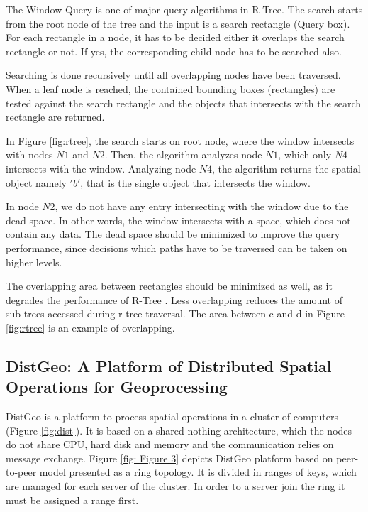 The Window Query is one of major query algorithms in R-Tree.
The search starts from the root node of the tree and the input is a search rectangle (Query box). 
For each rectangle in a node, it has to be decided either it overlaps the search rectangle or not. If yes, the corresponding child node has to be searched also. 

Searching is done recursively until all overlapping nodes have been traversed. 
When a leaf node is reached, the contained bounding boxes (rectangles) are tested against the search rectangle 
and the objects that intersects with the search rectangle are returned.

In Figure \ref{fig:rtree}, the search starts on root node, where the window intersects with nodes $N1$ and $N2$. Then, the algorithm analyzes node $N1$, 
which only $N4$ intersects with the window. Analyzing node $N4$, the algorithm returns the spatial object namely $'b'$, that is the single object that intersects the window.

In node $N2$, we do not have any entry intersecting with the window due to the dead space. 
In other words, the window intersects with a space, which does not contain any data.
The dead space should be minimized to improve the query performance, since decisions which paths have to be traversed can be taken on higher levels. 

The overlapping area between rectangles should be minimized as well, as it degrades the performance of R-Tree \cite{beckmann1990r}. 
Less overlapping reduces the amount of sub-trees accessed during r-tree traversal. The area between c and d in Figure \ref{fig:rtree} is an example of overlapping.

\subsection{DistGeo: A Platform of Distributed Spatial Operations for Geoprocessing}
\label{sub:dist_geo}	

DistGeo is a platform to process spatial operations in a cluster of computers (Figure \ref{fig:dist}). 
It is based on a shared-nothing architecture, which the nodes do not share CPU, hard disk and memory and the communication relies on message exchange. 
Figure \ref{fig: Figure 3} depicts DistGeo platform based on peer-to-peer model presented as a ring topology. 
It is divided in ranges of keys, which are managed for each server of the cluster. In order to a server join the ring it must be assigned a range first.

